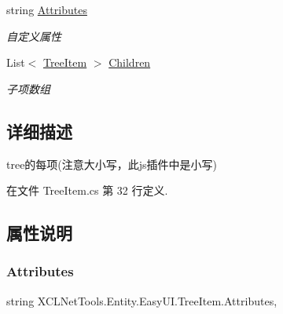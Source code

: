 \begin{DoxyCompactItemize}
string \hyperlink{class_x_c_l_net_tools_1_1_entity_1_1_easy_u_i_1_1_tree_item_a8f59dd785ca1acd2b70d5c159b711552}{Attributes}
\begin{DoxyCompactList}\small\item\em 自定义属性 \end{DoxyCompactList}\item 
List$<$ \hyperlink{class_x_c_l_net_tools_1_1_entity_1_1_easy_u_i_1_1_tree_item}{Tree\+Item} $>$ \hyperlink{class_x_c_l_net_tools_1_1_entity_1_1_easy_u_i_1_1_tree_item_a70ed6a7899043a9f8de3f28794ebd720}{Children}
\begin{DoxyCompactList}\small\item\em 子项数组 \end{DoxyCompactList}\end{DoxyCompactItemize}


\subsection{详细描述}
tree的每项(注意大小写，此js插件中是小写) 



在文件 Tree\+Item.\+cs 第 32 行定义.



\subsection{属性说明}
\mbox{\label{class_x_c_l_net_tools_1_1_entity_1_1_easy_u_i_1_1_tree_item_a8f59dd785ca1acd2b70d5c159b711552}} 
\subsubsection{\texorpdfstring{Attributes}{Attributes}}
{\footnotesize\ttfamily string X\+C\+L\+Net\+Tools.\+Entity.\+Easy\+U\+I.\+Tree\+Item.\+Attributes\hspace{0.3cm}{\ttfamily [get]}, {\ttfamily [set]}}



